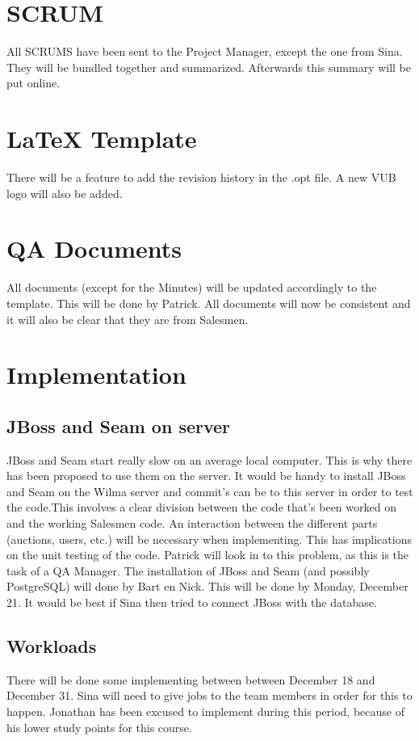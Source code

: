\documentclass[a4paper, 12pt]{article}
\begin{document}
	\section{SCRUM}
All SCRUMS have been sent to the Project Manager, except the one from Sina. They will be bundled together and summarized. Afterwards this summary will be put online.
 
	\section{\LaTeX{} Template}
There will be a feature to add the revision history in the .opt file. A new VUB logo will also be added.
	\section{QA Documents}
All documents (except for the Minutes) will be updated accordingly to the template. This will be done by Patrick. All documents will now be consistent and it will also be clear that they are from Salesmen. 
	\section{Implementation}
		\subsection{JBoss and Seam on server}
		JBoss and Seam start really slow on an average local computer. This is why there has been proposed to use them on the server. It would be handy to install JBoss and Seam on the Wilma server and commit's can be to this server in order to test the code.This involves a clear division between the code that's been worked on and the working Salesmen code. An interaction between the different parts (auctions, users, etc.) will be necessary when implementing. This has  implications on the unit testing of the code. Patrick will look in to this problem, as this is the task of a QA Manager. The installation of JBoss and Seam (and possibly PostgreSQL) will done by Bart en Nick. This will be done by Monday, December 21. It would be best if Sina then tried to connect JBoss with the database. 
		\subsection{Workloads}
There will be done some implementing between between December 18 and December 31. Sina will need to give jobs to the team members in order for this to happen. Jonathan has been excused to implement during this period, because of his lower study points for this course.
\end{document}
